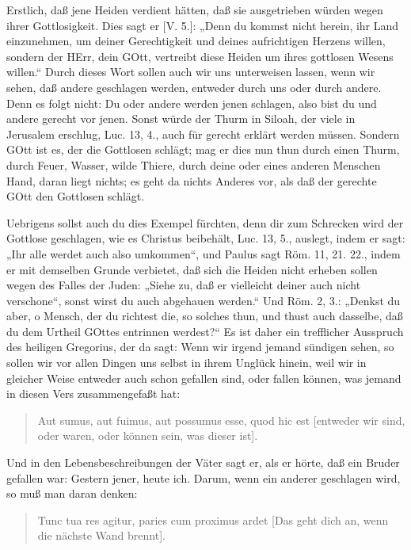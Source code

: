 Erstlich, daß jene Heiden verdient hätten, daß sie ausgetrieben würden wegen ihrer Gottlosigkeit. Dies sagt er [V. 5.]: „Denn du kommst nicht herein, ihr Land einzunehmen, um deiner Gerechtigkeit und deines aufrichtigen Herzens willen, sondern der HErr, dein GOtt, vertreibt diese Heiden um ihres gottlosen Wesens willen.“ Durch dieses Wort sollen auch wir uns unterweisen lassen, wenn wir sehen, daß andere geschlagen werden, entweder durch uns oder durch andere. Denn es folgt nicht: Du oder andere werden jenen schlagen, also bist du und andere gerecht vor jenen. Sonst würde der Thurm in Siloah, der viele in Jerusalem erschlug, Luc. 13, 4., auch für gerecht erklärt werden müssen. Sondern GOtt ist es, der die Gottlosen schlägt; mag er dies nun thun durch einen Thurm, durch Feuer, Wasser, wilde Thiere, durch deine oder eines anderen Menschen Hand, daran liegt nichts; es geht da nichts Anderes vor, als daß der gerechte GOtt den Gottlosen schlägt.

Uebrigens sollst auch du dies Exempel fürchten, denn dir zum Schrecken wird der Gottlose geschlagen, wie es Christus beibehält, Luc. 13, 5., auslegt, indem er sagt: „Ihr alle werdet auch also umkommen“, und Paulus sagt Röm. 11, 21. 22., indem er mit demselben Grunde verbietet, daß sich die Heiden nicht erheben sollen wegen des Falles der Juden: „Siehe zu, daß er vielleicht deiner auch nicht verschone“, sonst wirst du auch abgehauen werden.“ Und Röm. 2, 3.: „Denkst du aber, o Mensch, der du richtest die, so solches thun, und thust auch dasselbe, daß du dem Urtheil GOttes entrinnen werdest?“ Es ist daher ein trefflicher Ausspruch des heiligen Gregorius, der da sagt: Wenn wir irgend jemand sündigen sehen, so sollen wir vor allen Dingen uns selbst in ihrem Unglück hinein, weil wir in gleicher Weise entweder auch schon gefallen sind, oder fallen können, was jemand in diesen Vers zusammengefaßt hat:

\begin{quote}
Aut sumus, aut fuimus, aut possumus esse, quod hic est [entweder wir sind, oder waren, oder können sein, was dieser ist].
\end{quote}

Und in den Lebensbeschreibungen der Väter sagt er, als er hörte, daß ein Bruder gefallen war: Gestern jener, heute ich. Darum, wenn ein anderer geschlagen wird, so muß man daran denken:

\begin{quote}
Tunc tua res agitur, paries cum proximus ardet [Das geht dich an, wenn die nächste Wand brennt].
\end{quote}

